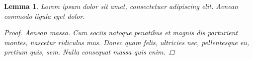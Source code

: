 \documentclass[a5paper]{article}
\newtheorem{lemma}{Lemma}
\begin{document}
	\setcounter{section}{1}
	
	\setcounter{lemma}{8}
	
	\begin{lemma}
		Lorem ipsum dolor sit amet, consectetuer adipiscing elit. Aenean commodo ligula eget dolor.
		
		\begin{proof}
			Aenean massa. Cum sociis natoque penatibus et magnis dis parturient montes, nascetur ridiculus mus. Donec quam felis, ultricies nec, pellentesque eu, pretium quis, sem. Nulla consequat massa quis enim.
		\end{proof}
	\end{lemma}
	
\end{document}
